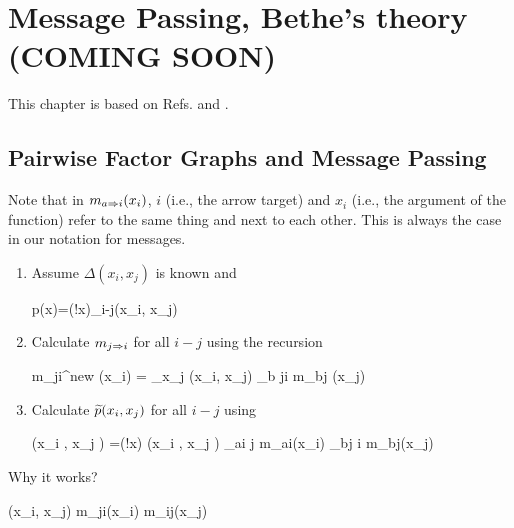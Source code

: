 \chapter{Message Passing, Bethe's theory
(COMING SOON)}
\label{ch-mpass-bethe}

\newcommand{\ttheta}[0]{\TIL{\theta}}
\newcommand{\tP}[0]{\TIL{p}}

This chapter is based
on Refs. \cite{WainJordan}
and \cite{yedidia}.

\section{Pairwise Factor
Graphs and Message Passing}

Note that 
in $m_{a\Rightarrow i}(x_i)$,
$i$ (i.e., the arrow target) 
and $x_i$ (i.e., the argument
of the function) 
refer to the same thing and
next to each other.
This is always the case in
our notation for messages.  


\begin{enumerate}
\item 
Assume $\Delta(x_i, x_j)$ is known and


\beq
p(x)=\caln(!x)\prod_{i-j}\Delta(x_i, x_j)
\eeq

\item Calculate $m_{j\Rightarrow i}$
for all $i-j$ using the recursion

\beq
m_{j\rdart i}^{new}
(x_i) =
\sum_{x_j}
\Delta(x_i, x_j)
\prod_{b\in
\partial j\setminus i}
m_{b\rdart j} (x_j) 
\eeq

\item Calculate $\tP (x_i
, x_j )$ for all $i-j$ using 
 
\beq
\tP (x_i
, x_j ) 
=\caln(!x)
 \Delta(x_i
, x_j )
\prod_{a\in \partial i \setminus j}
m_{a\rdart i}(x_i)
\prod_{b\in \partial j \setminus i}
m_{b\rdart j}(x_j)
\eeq
\end{enumerate}

Why it works?

\beq
\Delta(x_i, x_j)
\approx m_{j\rdart i}(x_i)
m_{i\rdart j}(x_j)
\eeq

